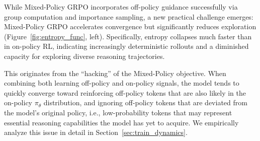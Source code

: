 \documentclass{article}
\begin{document}
While Mixed-Policy GRPO incorporates off-policy guidance successfully via group computation and importance sampling, a new practical challenge emerges: Mixed-Policy GRPO accelerates convergence but significantly reduces exploration (Figure~\ref{fig:entropy_func}, left). 
Specifically, entropy collapses much faster than in on-policy RL, indicating increasingly deterministic rollouts and a diminished capacity for exploring diverse reasoning trajectories.

This originates from the ``hacking'' of the Mixed-Policy objective. 
When combining both learning off-policy and on-policy signals, the model tends to quickly converge toward reinforcing off-policy tokens that are also likely in the on-policy $\pi_{\theta}$ distribution, and ignoring off-policy tokens that are deviated from the model's original policy, i.e., low-probability tokens that may represent essential reasoning capabilities the model has yet to acquire. 
We empirically analyze this issue in detail in Section~\ref{sec:train_dynamics}.

\end{document}

